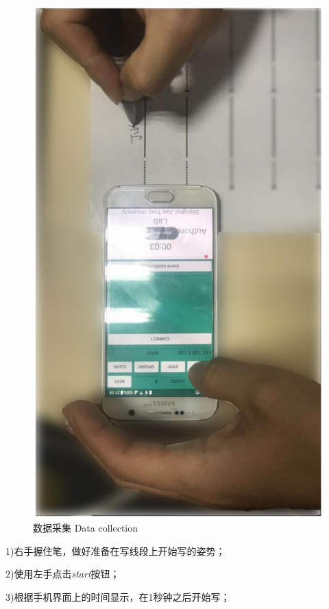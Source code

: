 \begin{figure}
\begin{minipage}[t]{0.32\textwidth}
    \centering
    \includegraphics[width=\textwidth]{figure/app-data-collection.pdf}
    \bicaption
    {数据采集}
    {Data collection}
    \label{fig:data-collection}
   \end{minipage}
\end{figure}

1)右手握住笔，做好准备在写线段上开始写的姿势；

2)使用左手点击\textit{start}按钮；

3)根据手机界面上的时间显示，在1秒钟之后开始写；

